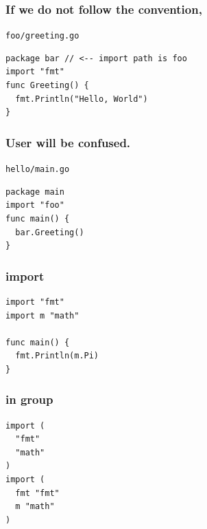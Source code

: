 \documentclass[xetex,mathserif,serif,12pt]{beamer}
\begin{document}
\begin{frame}[fragile]
  \frametitle{If we do not follow the convention,}

  \begin{beamer@nomargin@title}
    \texttt{\alert{foo}/greeting.go}
  \end{beamer@nomargin@title}

  \begin{beamer@nomargin}
    \begin{lstlisting}[basicstyle=\small\ttfamily]
package bar // <-- import path is foo
import "fmt"
func Greeting() {
  fmt.Println("Hello, World")
}
    \end{lstlisting}
  \end{beamer@nomargin}
\end{frame}

\begin{frame}[fragile]
  \frametitle{User will be confused.}

  \begin{beamer@nomargin@title}
    \texttt{hello/main.go}
  \end{beamer@nomargin@title}

  \begin{beamer@nomargin}
    \begin{lstlisting}[basicstyle=\small\ttfamily]
package main
import "foo"
func main() {
  bar.Greeting()
}
    \end{lstlisting}
  \end{beamer@nomargin}
\end{frame}

\begin{frame}[fragile]
  \frametitle{\ttfamily import}

  \begin{beamer@nomargin}
    \begin{lstlisting}[basicstyle=\small\ttfamily]
import "fmt"
import m "math"

func main() {
  fmt.Println(m.Pi)
}
    \end{lstlisting}
  \end{beamer@nomargin}
\end{frame}

\begin{frame}[fragile]
  \frametitle{in group}

  \begin{beamer@nomargin}
    \begin{lstlisting}[basicstyle=\small\ttfamily]
import (
  "fmt"
  "math"
)
import (
  fmt "fmt"
  m "math"
)
    \end{lstlisting}
  \end{beamer@nomargin}
\end{frame}
\end{document}
